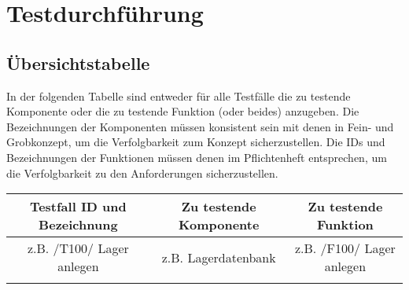 
\chapter{Testdurchf\"uhrung}


\section{\"Ubersichtstabelle}
  In der folgenden Tabelle sind entweder f\"ur alle Testf\"alle die zu testende
  Komponente oder die zu testende Funktion (oder beides) anzugeben. Die
  Bezeichnungen der Komponenten m\"ussen konsistent sein mit denen in Fein- und
  Grobkonzept, um die Verfolgbarkeit zum Konzept sicherzustellen. Die IDs und
  Bezeichnungen der Funktionen m\"ussen denen im Pflichtenheft entsprechen, um
  die Verfolgbarkeit zu den Anforderungen sicherzustellen. \\
\begin{tabular}{|c|c|c|}
\hline
\textbf{Testfall ID und Bezeichnung} &  \textbf {Zu testende Komponente} &
\textbf {Zu testende Funktion}\\
\hline
z.B. /T100/ Lager anlegen &  z.B. Lagerdatenbank  & z.B. /F100/ Lager anlegen \\
\hline
&&
\end{tabular}


%



